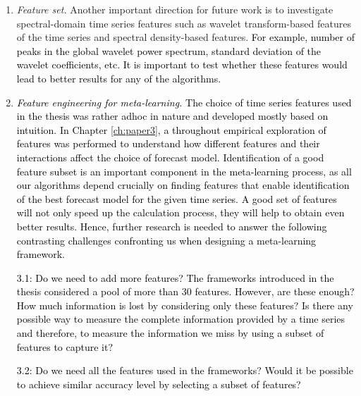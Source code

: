 \documentclass{monashthesis}
\begin{document}
\begin{enumerate}
\def\labelenumi{\arabic{enumi}.}
\setcounter{enumi}{1}
\item
  \emph{Feature set.} Another important direction for future work is to investigate spectral-domain time series features such as wavelet transform-based features of the time series and spectral density-based features. \textcolor{black}{For example, number of peaks in the global wavelet power spectrum, standard deviation of the wavelet coefficients, etc. It is important to test whether these features would lead to better results for any of the algorithms.}
\item
  \textcolor{black}{\textit{Feature engineering for meta-learning.} The choice of time series features used in the thesis was rather adhoc in nature and developed mostly based on intuition.} \textcolor{black}{In Chapter} \ref{ch:paper3}\textcolor{black}{, a throughout empirical exploration of features was performed to understand how different features and their interactions affect the choice of forecast model.  Identification of a good feature subset is an important component in the meta-learning process, as all our algorithms depend crucially on finding features that enable identification of the best forecast model for the given time series.  A good set of features will not only speed up the calculation process, they will help to obtain even better results. Hence, further research is needed to answer the following contrasting challenges confronting us when designing a meta-learning framework.}

  \textcolor{black}{3.1: Do we need to add more features? The frameworks introduced in the thesis considered a pool of more than 30 features. However, are these enough? How much information is lost by considering only these features? Is there any possible way to measure the complete information provided by a time series and therefore, to measure the information we miss by using a subset of features to capture it?}

  \textcolor{black}{ 3.2: Do we need all the features used in the frameworks? Would it be possible to achieve similar accuracy level by selecting a subset of features?}


\end{enumerate}
\end{document}
